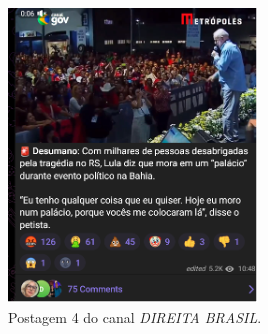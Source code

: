 \documentclass[portuguese]{textolivre}
\begin{document}
\begin{figure}[h!]
    \begin{minipage}[t]{0.47\textwidth}
        \centering
        \includegraphics[width=\linewidth]{Imagens/Fig31.png}
        \caption{Postagem 4 do canal \emph{DIREITA BRASIL}.}
        \label{fig-31}
    \end{minipage}\hfill
    \begin{minipage}[t]{0.29\textwidth}
        \centering

\end{minipage}
\end{figure}
\end{document}
